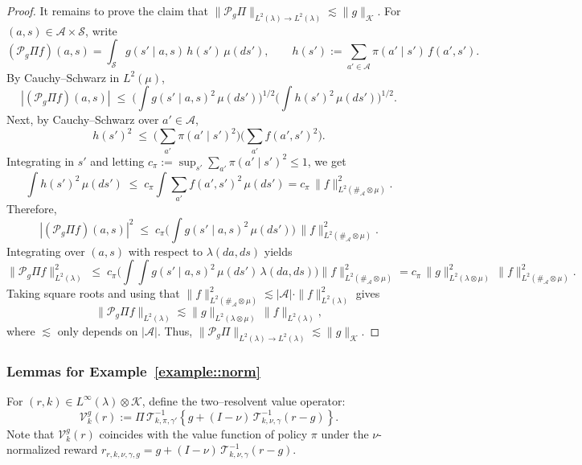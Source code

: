\documentclass[11pt]{article}
\theoremstyle{plain}
\begin{document}
\begin{proof}
It remains to prove the claim that $\|\mathcal{P}_{g}\Pi \|_{L^2(\lambda) \rightarrow L^2(\lambda)} \lesssim \|g\|_{\mathcal{K}}$. For $(a,s)\in\mathcal{A}\times\mathcal{S}$, write
\[
(\mathcal{P}_{g}\Pi f)(a,s)
= \int_{\mathcal S} g(s' \mid a,s)\,h(s')\,\mu(ds'),
\qquad
h(s') := \sum_{a'\in\mathcal A} \pi(a' \mid s')\, f(a',s').
\]
By Cauchy--Schwarz in $L^2(\mu)$,
\[
|(\mathcal{P}_{g}\Pi f)(a,s)|
\;\le\; \Big(\int g(s'\mid a,s)^2\,\mu(ds')\Big)^{1/2}
       \Big(\int h(s')^2\,\mu(ds')\Big)^{1/2}.
\]
Next, by Cauchy--Schwarz over $a'\in\mathcal A$,
\[
h(s')^2 \;\le\; \Big(\sum_{a'} \pi(a'\mid s')^2\Big)\Big(\sum_{a'} f(a',s')^2\Big).
\]
Integrating in $s'$ and letting $c_\pi := \sup_{s'}\sum_{a'} \pi(a'\mid s')^2\le 1$, we get
\[
\int h(s')^2\,\mu(ds') \;\le\; c_\pi \int \sum_{a'} f(a',s')^2\,\mu(ds')
= c_\pi\,\|f\|_{L^2(\#_{\mathcal A}\otimes \mu)}^2.
\]
Therefore,
\[
|(\mathcal{P}_{g}\Pi f)(a,s)|^2
\;\le\; c_\pi\Big(\int g(s'\mid a,s)^2\,\mu(ds')\Big)\,\|f\|_{L^2(\#_{\mathcal A}\otimes \mu)}^2.
\]
Integrating over $(a,s)$ with respect to $\lambda(da,ds)$ yields
\[
\|\mathcal{P}_{g}\Pi f\|_{L^2(\lambda)}^2
\;\le\; c_\pi \Big(\int\!\!\int g(s'\mid a,s)^2\,\mu(ds')\,\lambda(da,ds)\Big)
          \|f\|_{L^2(\#_{\mathcal A}\otimes \mu)}^2
= c_\pi\,\|g\|_{L^2(\lambda\otimes \mu)}^2\,\|f\|_{L^2(\#_{\mathcal A}\otimes \mu)}^2.
\]
Taking square roots and using that $\|f\|_{L^2(\#_{\mathcal A}\otimes \mu)}^2 \lesssim |\mathcal{A}| \cdot \|f\|_{L^2(\lambda)}^2$ gives
\[
\|\mathcal{P}_{g}\Pi f\|_{L^2(\lambda)}
\lesssim \|g\|_{L^2(\lambda\otimes \mu)}\,\|f\|_{L^2(\lambda)},
\]
where $\lesssim$ only depends on  $|\mathcal{A}|$. Thus, $\|\mathcal{P}_{g}\Pi \|_{L^2(\lambda) \rightarrow L^2(\lambda)} \lesssim \|g\|_{\mathcal{K}}$.



\end{proof}


 

\subsubsection{Lemmas for Example~\ref{example::norm}}
\label{lemmas::norm}

For $(r,k) \in L^\infty(\lambda) \otimes \mathcal{K}$, define the two–resolvent value operator:
\[
\mathcal{V}_k^g(r) := \Pi\,\mathcal{T}_{k,\pi,\gamma'}^{-1}\!\left\{g + (I - \nu)\,\mathcal{T}_{k,\nu,\gamma}^{-1}(r-g)\right\}.
\]
Note that $\mathcal{V}_k^g(r)$ coincides with the value function of policy $\pi$ under the 
$\nu$-normalized reward \(r_{r,k,\nu,\gamma,g} = g + (I - \nu)\,\mathcal{T}_{k,\nu,\gamma}^{-1}(r-g)\).
\end{document}
